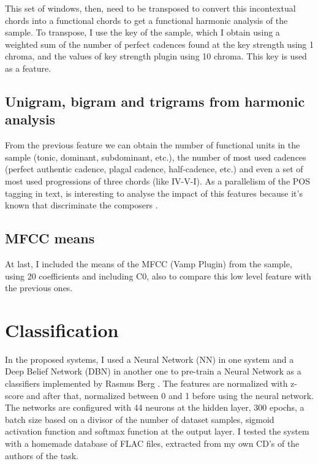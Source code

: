 \documentclass[a4paper,openany,oneside,12pt]{book}
\begin{document}
This set of windows, then, need to be transposed to convert this incontextual chords into a functional chords to get a functional harmonic analysis of the sample. To transpose, I use the key of the sample, which I obtain using a weighted sum of the number of perfect cadences found at the key strength using 1 chroma, and the values of key strength plugin using 10 chroma. This key is used as a feature.

\subsection{Unigram, bigram and trigrams from harmonic analysis}\label{subsec:uni_bi_tri}

From the previous feature we can obtain the number of functional units in the sample (tonic, dominant, subdominant, etc.), the number of most used cadences (perfect authentic cadence, plagal cadence, half-cadence, etc.) and even a set of most used progressions of three chords (like IV-V-I). As a parallelism of the POS tagging in text, is interesting to analyse the impact of this features because it's known that discriminate the composers \cite{desportes}.

\subsection{MFCC means}\label{subsec:mfcc_means}
At last, I included the means of the MFCC (Vamp Plugin) from the sample, using 20 coefficients and including C0, also to compare this low level feature with the previous ones.


\section{Classification}\label{sec:classification}

In the proposed systems, I used a Neural Network (NN) in one system and a Deep Belief Network (DBN) in another one to pre-train a Neural Network as a classifiers implemented by Rasmus Berg \cite{IMM2012-06284}. The features are normalized with z-score and after that, normalized between 0 and 1 before using the neural network. The networks are configured with 44 neurons at the hidden layer, 300 epochs, a batch size based on a divisor of the number of dataset samples, sigmoid activation function and softmax function at the output layer. I tested the system with a homemade database of FLAC files, extracted from my own CD's of the authors of the task.
\end{document}

